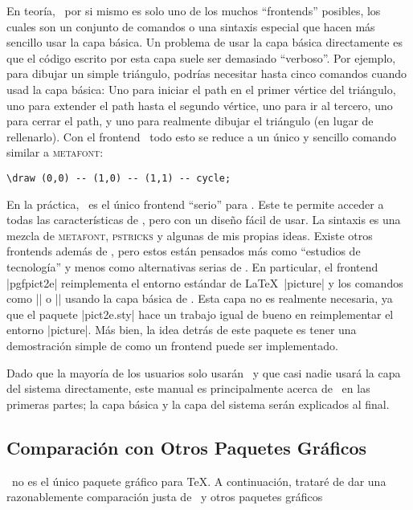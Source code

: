 En teoría, \tikzname\ por si mismo es solo uno de los muchos ``frontends''
posibles, los cuales son un conjunto de comandos o una sintaxis especial que
hacen más sencillo usar la capa básica. Un problema de usar la capa básica
directamente es que el código escrito por esta capa suele ser demasiado
``verboso''. Por ejemplo, para dibujar un simple triángulo, podrías necesitar
hasta cinco comandos cuando usad la capa básica: Uno para iniciar el path en el
primer vértice del triángulo, uno para extender el path hasta el segundo
vértice, uno para ir al tercero, uno para cerrar el path, y uno para realmente
dibujar el triángulo (en lugar de rellenarlo). Con el frontend \tikzname\  todo
esto se reduce a un único y sencillo comando similar a \textsc{metafont}:
%
\begin{verbatim}
\draw (0,0) -- (1,0) -- (1,1) -- cycle;
\end{verbatim}

En la práctica, \tikzname\ es el único frontend ``serio'' para \pgfname. Este te
permite acceder a todas las características de \pgfname, pero con un diseño
fácil de usar. La sintaxis es una mezcla de \textsc{metafont}, \textsc{pstricks}
y algunas de mis propias ideas. Existe otros frontends además de \tikzname, pero
estos están pensados más como ``estudios de tecnología'' y menos como
alternativas serias de \tikzname. En particular, el frontend |pgfpict2e|
reimplementa el entorno estándar de \LaTeX\ |{picture}| y los comandos como
|\line| o |\vector| usando la capa básica de \pgfname. Esta capa no es realmente
necesaria, ya que el paquete |pict2e.sty| hace un trabajo igual de bueno en
reimplementar el entorno |{picture}|. Más bien, la idea detrás de este paquete
es tener una demostración simple de como un frontend puede ser implementado.

Dado que la mayoría de los usuarios solo usarán \tikzname\ y que casi nadie
usará la capa del sistema directamente, este manual es principalmente acerca de
\tikzname\ en las primeras partes; la capa básica y la capa del sistema serán
explicados al final.

\subsection{Comparación con Otros Paquetes Gráficos}

\tikzname\ no es el único paquete gráfico para \TeX. A continuación, trataré de
dar una razonablemente comparación justa de \tikzname\ y otros paquetes gráficos
%



